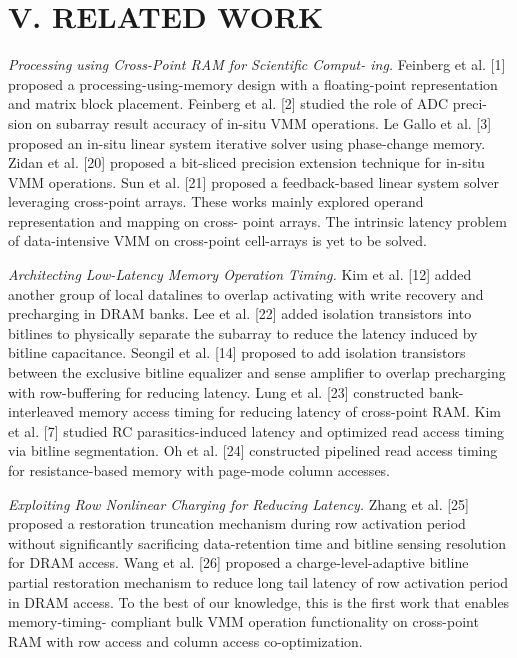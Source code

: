 \documentclass{article}
\begin{document}
	\section*{V. RELATED WORK}
		\textit{Processing using Cross-Point RAM for Scientific Comput-
		ing.} Feinberg et al. [1] proposed a processing-using-memory
		design with a floating-point representation and matrix block
		placement. Feinberg et al. [2] studied the role of ADC preci-
		sion on subarray result accuracy of in-situ VMM operations.
		Le Gallo et al. [3] proposed an in-situ linear system iterative
		solver using phase-change memory. Zidan et al. [20] proposed
		a bit-sliced precision extension technique for in-situ VMM
		operations. Sun et al. [21] proposed a feedback-based linear
		system solver leveraging cross-point arrays. These works
		mainly explored operand representation and mapping on cross-
		point arrays. The intrinsic latency problem of data-intensive
		VMM on cross-point cell-arrays is yet to be solved.
		
		\textit{Architecting Low-Latency Memory Operation Timing.} Kim
		et al. [12] added another group of local datalines to overlap
		activating with write recovery and precharging in DRAM
		banks. Lee et al. [22] added isolation transistors into bitlines to
		physically separate the subarray to reduce the latency induced
		by bitline capacitance. Seongil et al. [14] proposed to add
		isolation transistors between the exclusive bitline equalizer and
		sense amplifier to overlap precharging with row-buffering for
		reducing latency. Lung et al. [23] constructed bank-interleaved
		memory access timing for reducing latency of cross-point
		RAM. Kim et al. [7] studied RC parasitics-induced latency
		and optimized read access timing via bitline segmentation.
		Oh et al. [24] constructed pipelined read access timing for
		resistance-based memory with page-mode column accesses.
		
		\textit{Exploiting Row Nonlinear Charging for Reducing Latency.}
		Zhang et al. [25] proposed a restoration truncation mechanism
		during row activation period without significantly sacrificing
		data-retention time and bitline sensing resolution for DRAM
		access. Wang et al. [26] proposed a charge-level-adaptive
		bitline partial restoration mechanism to reduce long tail latency
		of row activation period in DRAM access. To the best of our
		knowledge, this is the first work that enables memory-timing-
		compliant bulk VMM operation functionality on cross-point
		RAM with row access and column access co-optimization.
 		
\end{document}
